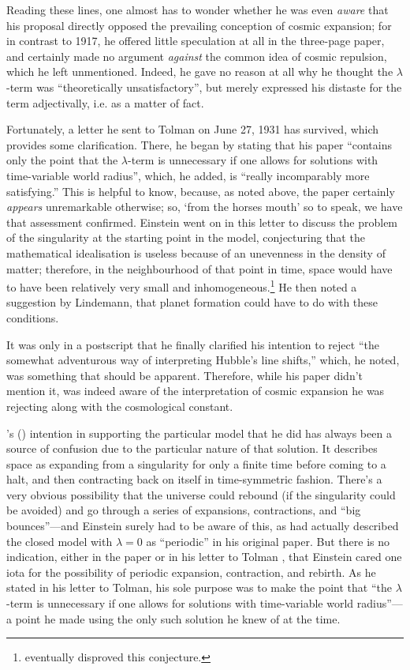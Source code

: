 \documentclass[12 pt]{article}
\def\citeapos#1{\citeauthor{#1}'s (\citeyear{#1})}
\begin{document}
Reading these lines, one almost has to wonder whether he was even \textit{aware} that his proposal directly opposed the prevailing conception of cosmic expansion; for in contrast to 1917, he offered little speculation at all in the three-page paper, and certainly made no argument \textit{against} the common idea of cosmic repulsion, which he left unmentioned. Indeed, he gave no reason at all why he thought the $\lambda$-term was ``theoretically unsatisfactory'', but merely expressed his distaste for the term adjectivally, i.e. as a matter of fact.

Fortunately, a letter he sent to Tolman on June 27, 1931 has survived, which provides some clarification. There, he began by stating that his paper ``contains only the point that the $\lambda$-term is unnecessary if one allows for solutions with time-variable world radius'', which, he added, is ``really incomparably more satisfying.'' This is helpful to know, because, as noted above, the paper certainly \textit{appears} unremarkable otherwise; so, `from the horses mouth' so to speak, we have that assessment confirmed. Einstein went on in this letter to discuss the problem of the singularity at the starting point in the model, conjecturing that the mathematical idealisation is useless because of an unevenness in the density of matter; therefore, in the neighbourhood of that point in time, space would have to have been relatively very small and inhomogeneous.\footnote{\citet{Hawking1967} eventually disproved this conjecture.}  He then noted a suggestion by Lindemann, that planet formation could have to do with these conditions. 

It was only in a postscript that he finally clarified his intention to reject ``the somewhat adventurous way of interpreting Hubble's line shifts,'' which, he noted, was something that should be apparent. Therefore, while his paper didn't mention it, \citet{Einstein1931a} was indeed aware of the interpretation of cosmic expansion he was rejecting along with the cosmological constant.
	
\citeapos{Einstein1931a} intention in supporting the particular model that he did has always been a source of confusion due to the particular nature of that solution. It describes space as expanding from a singularity for only a finite time before coming to a halt, and then contracting back on itself in time-symmetric fashion. There's a very obvious possibility that the universe could rebound (if the singularity could be avoided) and go through a series of expansions, contractions, and ``big bounces''---and Einstein surely had to be aware of this, as \citet{Friedmann1922} had actually described the closed model with $\lambda=0$ as ``periodic'' in his original paper. But there is no indication, either in the paper \citep{Einstein1931a} or in his letter to Tolman \citep{Einstein1931b}, that Einstein cared one iota for the possibility of periodic expansion, contraction, and rebirth. As he stated in his letter to Tolman, his sole purpose was to make the point that ``the $\lambda$-term is unnecessary if one allows for solutions with time-variable world radius''---a point he made using the only such solution he knew of at the time.
\end{document}
